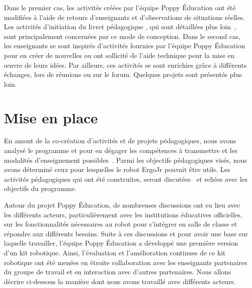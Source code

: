             Dans le premier cas, les activités créées par l'équipe Poppy Éducation ont été modifiées à l'aide de retours d'enseignants et d'observations de situations réelles. Les activités d'initiation du livret pédagogique , qui sont détaillées plus loin~, sont principalement concernées par ce mode de conception. Dans le second cas, les enseignants se sont inspirés d'activités fournies par l'équipe Poppy Éducation pour en créer de nouvelles ou ont sollicité de l'aide technique pour la mise en œuvre de leurs idées. Par ailleurs, ces activités se sont enrichies grâce à différents échanges, lors de réunions ou sur le forum. Quelques projets sont présentés plus loin.
\section{Mise en place}
        En amont de la co-création d'activités et de projets pédagogiques, nous avons analysé le programme  et  pour en dégager les compétences à transmettre et les modalités d'enseignement possibles~. Parmi les objectifs pédagogiques visés, nous avons déterminé ceux pour lesquelles le robot ErgoJr pouvait être utile. Les activités pédagogiques qui ont été construites, seront discutées~ et reliées avec les objectifs du programme.\par%
        Autour du projet Poppy Éducation, de nombreuses discussions ont eu lieu avec les différents acteurs, particulièrement avec les institutions éducatives officielles, sur les fonctionnalités nécessaires au robot pour s'intégrer en salle de classe et répondre aux différents besoins.
        Suite à ces discussions et pour avoir une base sur laquelle travailler, l'équipe Poppy Éducation a développé une première version d'un kit robotique.
        Ainsi, l'évaluation et l'amélioration continues de ce kit robotique ont été menées en étroite collaboration avec les enseignants partenaires du groupe de travail et en interaction avec d'autres partenaires. Nous allons décrire ci-dessous la manière dont nous avons travaillé avec différents acteurs.
